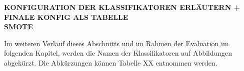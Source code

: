 \textbf{KONFIGURATION DER KLASSIFIKATOREN ERLÄUTERN + FINALE KONFIG ALS TABELLE}\\\textbf{SMOTE}

Im weiteren Verlauf dieses Abschnitts und im Rahmen der Evaluation im folgenden Kapitel, werden die Namen der Klassifikatoren auf Abbildungen abgekürzt. Die Abkürzungen können Tabelle XX entnommen werden.

\begin{table}
\centering
\caption{Zuordnung der verwendeten Abkürzungen}
\label{tab:abbs}
\end{table}

